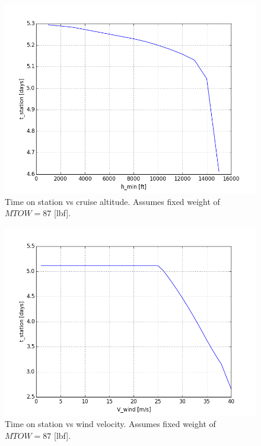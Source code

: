 \documentclass[10pt, a4paper]{article}
\begin{document}
\begin{figure}[h!]
\begin{center}
\includegraphics[scale = .6]{tvsh_min}
\caption{Time on station vs cruise altitude. Assumes fixed weight of $MTOW = 87$ [lbf].}
\end{center}
\end{figure}

\begin{figure}[h!]
\begin{center}
\includegraphics[scale = .6]{tvsV_wind}
\caption{Time on station vs wind velocity.  Assumes fixed weight of $MTOW = 87$ [lbf].}
\end{center}
\end{figure}
\end{document}
